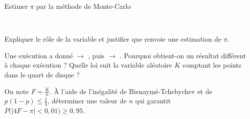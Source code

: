 \begin{exercice}[3]{Estimer $\pi$ par la méthode de Monte-Carlo}
\begin{codecote}[0.5]
\\[0.5mm]
\end{codecote}
\begin{questions}
  \item Expliquer le rôle de la variable  et justifier que  renvoie une estimation de $\pi$.
  \item Une exécution a donné  $\to$ , puis  $\to$ .
    Pourquoi obtient-on un résultat différent à chaque exécution ? Quelle loi suit la variable aléatoire $K$ comptant les points
    dans le quart de disque ?
  \item On note $F=\frac{K}{n}$. À l'aide de l'inégalité de Bienaymé-Tchebychev et de $p(1-p)\leq\frac14$, déterminer une valeur
    de $n$ qui garantit $P\big(|4F-\pi|<0{,}01\big)\geq0{,}95$.
\end{questions}
\end{exercice}

